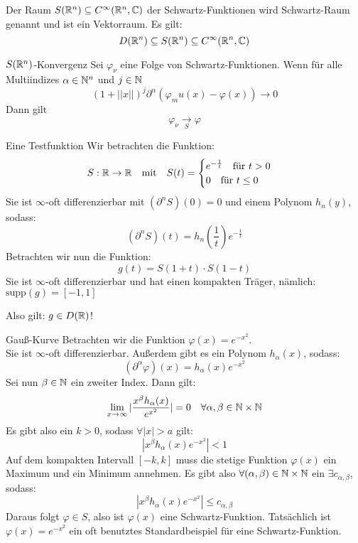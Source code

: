Der Raum $S(\mathbb{R}^n)\subseteq C^\infty(\mathbb{R}^n, \mathbb{C})$ der Schwartz-Funktionen wird Schwartz-Raum genannt und ist ein Vektorraum. Es gilt:
$$D(\mathbb{R}^n)\subseteq S(\mathbb{R}^n)\subseteq C^\infty(\mathbb{R}^n, \mathbb{C})$$
\begin{Def}{$S(\mathbb{R}^n)$-Konvergenz}
    Sei $\varphi_\nu$ eine Folge von Schwartz-Funktionen. Wenn für alle Multiindizes $\alpha\in \mathbb{N}^n$ und $j\in \mathbb{N}$
    $$(1+||x||)^j \partial^\alpha (\varphi_mu(x)-\varphi(x))\rightarrow 0$$
    Dann gilt $$\varphi_\nu \underset{S}{\rightarrow}\varphi$$
\end{Def}

\begin{Beispiel}{Eine Testfunktion}
Wir betrachten die Funktion:
$$S:\mathbb{R}\rightarrow \mathbb{R} \quad \text{mit} \quad S(t)=\begin{cases}e^{-\frac{1}{t}}\quad \mbox{für $t>0$} \\ 0 \quad \mbox{für $t\leq 0$}\end{cases}$$
Sie ist $\infty$-oft differenzierbar mit $(\partial^n S)(0)=0$ und einem Polynom $h_n(y)$, sodass:
$$(\partial^n S)(t)=h_n(\frac{1}{t})e^{-\frac{1}{t}}$$
Betrachten wir nun die Funktion:
$$g(t)=S(1+t)\cdot S(1-t)$$
Sie ist $\infty$-oft differenzierbar und hat einen kompakten Träger, nämlich:
$\text{supp}(g) = [-1,1]$
\begin{center}
    Also gilt: $g\in D(\mathbb{R})$!
\end{center}
\end{Beispiel}
\begin{Beispiel}{Gauß-Kurve}
    Betrachten wir die Funktion $\varphi(x)=e^{-x^2}$. \\
    Sie ist $\infty$-oft differenzierbar. Außerdem gibt es ein Polynom $h_\alpha(x)$, sodass:
    $$(\partial^\alpha \varphi)(x) = h_\alpha(x)e^{-x^2}$$
    Sei nun $\beta\in \mathbb{N}$ ein zweiter Index. Dann gilt:
    $$\lim_{x\rightarrow \infty} |\frac{x^\beta h_\alpha(x)}{e^{x^2}}|=0 \quad \forall \alpha, \beta \in \mathbb{N}\times \mathbb{N}$$
    Es gibt also ein $k>0$, sodass $\forall |x|>a$ gilt:
    $$|x^\beta h_\alpha(x) e^{-x^2}|<1$$
    Auf dem kompakten Intervall $[-k,k]$ muss die stetige Funktion $\varphi(x)$ ein Maximum und ein Minimum annehmen. Es gibt also $\forall (\alpha, \beta)\in \mathbb{N}\times \mathbb{N}$ ein $\exists c_{\alpha,\beta}$, sodass:
    $$|x^\beta h_\alpha(x)e^{-x^2}|\leq c_{\alpha, \beta}$$
    Daraus folgt $\varphi\in S$, also ist $\varphi(x)$ eine Schwartz-Funktion. Tatsächlich ist $\varphi(x)=e^{-x^2}$ ein oft benutztes Standardbeispiel für eine Schwartz-Funktion.
\end{Beispiel}
\newpage
